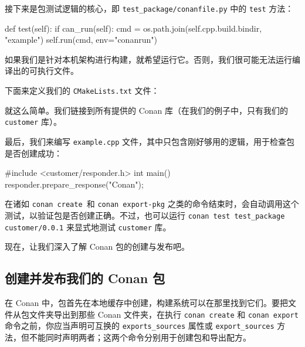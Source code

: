 \label{idx:739}
接下来是包测试逻辑的核心，即 \texttt{test\_\allowbreak{}package/\allowbreak{}conanfile.\allowbreak{}py} 中的 \texttt{test} 方法：

\begin{codebox}[python]
    def test(self):
        if can_run(self):
            cmd = os.path.join(self.cpp.build.bindir, "example")
            self.run(cmd, env="conanrun")
\end{codebox}

如果我们是针对本机架构进行构建，就希望运行它。否则，我们很可能无法运行编译出的可执行文件。

下面来定义我们的 \texttt{CMake\allowbreak{}Lists.\allowbreak{}txt} 文件：


就这么简单。我们链接到所有提供的 Conan 库（在我们的例子中，只有我们的 \texttt{customer} 库）。

最后，我们来编写 \texttt{example.\allowbreak{}cpp} 文件，其中只包含刚好够用的逻辑，用于检查包是否创建成功：

\begin{codebox}[cpp]
#include <customer/responder.h>
int main() { responder{}.prepare_response("Conan"); }
\end{codebox}

\label{idx:740}
在诸如 \texttt{conan create }和 \texttt{conan export-pkg} 之类的命令结束时，会自动调用这个测试，以验证包是否创建正确。不过，也可以运行 \texttt{conan test test\_\allowbreak{}package customer/\allowbreak{}0.\allowbreak{}0.\allowbreak{}1} 来显式地测试 \texttt{customer} 库。

现在，让我们深入了解 Conan 包的创建与发布吧。

\subsection{创建并发布我们的 Conan 包}

\label{idx:741}
在 Conan 中，包首先在本地缓存中创建，构建系统可以在那里找到它们。要把文件从包文件夹导出到那些 Conan 文件夹，在执行 \texttt{conan create} 和 \texttt{conan export} 命令之前，你应当声明可互换的 \texttt{exports\_\allowbreak{}sources} 属性或 \texttt{export\_\allowbreak{}sources} 方法，但不能同时声明两者；这两个命令分别用于创建包和导出配方。


